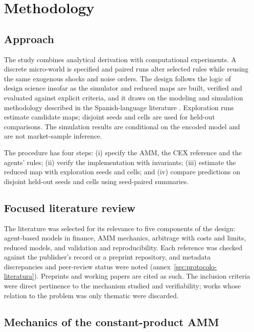 \chapter{Methodology}
\label{cap:metodologia}

\section{Approach}

The study combines analytical derivation with computational experiments. A discrete micro-world is specified and paired runs alter selected rules while reusing the same exogenous shocks and noise orders. The design follows the logic of design science \cite{hevner2004design} insofar as the simulator and reduced maps are built, verified and evaluated against explicit criteria, and it draws on the modeling and simulation methodology described in the Spanish-language literature \cite{hernandez2014metodologia}. Exploration runs estimate candidate maps; disjoint seeds and cells are used for held-out comparisons. The simulation results are conditional on the encoded model and are not market-sample inference.

The procedure has four steps: (i) specify the AMM, the CEX reference and the agents' rules; (ii) verify the implementation with invariants; (iii) estimate the reduced map with exploration seeds and cells; and (iv) compare predictions on disjoint held-out seeds and cells using seed-paired summaries.

\section{Focused literature review}

The literature was selected for its relevance to five components of the design: agent-based models in finance, AMM mechanics, arbitrage with costs and limits, reduced models, and validation and reproducibility. Each reference was checked against the publisher's record or a preprint repository, and metadata discrepancies and peer-review status were noted (annex~\ref{sec:protocolo-literatura}). Preprints and working papers are cited as such. The inclusion criteria were direct pertinence to the mechanism studied and verifiability; works whose relation to the problem was only thematic were discarded.

\section{Mechanics of the constant-product AMM}
\label{sec:amm}

